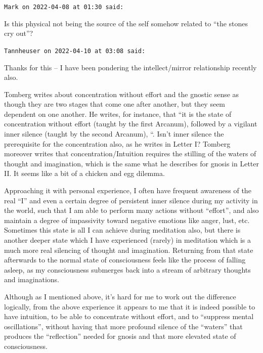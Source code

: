 \begin{footnotesize}
\begin{sffamily}
\texttt{Mark on 2022-04-08 at 01:30 said:}

Is this physical not being the source of the self somehow related to ``the stones cry out''?

\hfill

\texttt{Tannheuser on 2022-04-10 at 03:08 said:}

Thanks for this -- I have been pondering the intellect/mirror relationship recently also.

Tomberg writes about concentration without effort and the gnostic sense as though they are two stages that come one after another, but they seem dependent on one another. He writes, for instance, that ``it is the state of concentration without effort (taught by the first Arcanum), followed by a vigilant inner silence (taught by the second Arcanum), ``. Isn't inner silence the prerequisite for the concentration also, as he writes in Letter I? Tomberg moreover writes that concentration/Intuition requires the stilling of the waters of thought and imagination, which is the same what he describes for gnosis in Letter II. It seems like a bit of a chicken and egg dilemma.

Approaching it with personal experience, I often have frequent awareness of the real ``I'' and even a certain degree of persistent inner silence during my activity in the world, such that I am able to perform many actions without ``effort'', and also maintain a degree of impassivity toward negative emotions like anger, lust, etc. Sometimes this state is all I can achieve during meditation also, but there is another deeper state which I have experienced (rarely) in meditation which is a much more real silencing of thought and imagination. Returning from that state afterwards to the normal state of consciousness feels like the process of falling asleep, as my consciousness submerges back into a stream of arbitrary thoughts and imaginations.

Although as I mentioned above, it's hard for me to work out the difference logically, from the above experience it appears to me that it is indeed possible to have intuition, to be able to concentrate without effort, and to ``suppress mental oscillations'', without having that more profound silence of the ``waters'' that produces the ``reflection'' needed for gnosis and that more elevated state of consciousness.

\hfill


\end{sffamily}
\end{footnotesize}
